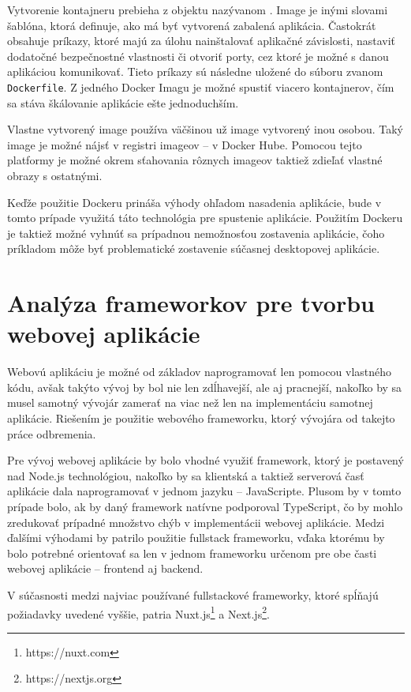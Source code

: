 Vytvorenie kontajneru prebieha z objektu nazývanom . Image je inými slovami šablóna, ktorá definuje, ako má byť vytvorená zabalená aplikácia. Častokrát obsahuje príkazy, ktoré majú za úlohu nainštalovať aplikačné závislosti, nastaviť dodatočné bezpečnostné vlastnosti či otvoriť porty, cez ktoré je možné s danou aplikáciou komunikovať. Tieto príkazy sú následne uložené do súboru zvanom \texttt{Dockerfile}. Z jedného Docker Imagu je možné spustiť viacero kontajnerov, čím sa stáva škálovanie aplikácie ešte jednoduchším.

Vlastne vytvorený image používa väčšinou už image vytvorený inou osobou. Taký image je možné nájsť v registri imageov -- v Docker Hube. Pomocou tejto platformy je možné okrem sťahovania rôznych imageov taktiež zdieľať vlastné obrazy s ostatnými.

Keďže použitie Dockeru prináša výhody ohľadom nasadenia aplikácie, bude v tomto prípade využitá táto technológia pre spustenie aplikácie. Použitím Dockeru je taktiež možné vyhnúť sa prípadnou nemožnosťou zostavenia aplikácie, čoho príkladom môže byť problematické zostavenie súčasnej desktopovej aplikácie.

\clearpage

\section {Analýza frameworkov pre tvorbu webovej aplikácie}
Webovú aplikáciu je možné od základov naprogramovať len pomocou vlastného kódu, avšak takýto vývoj by bol nie len zdĺhavejší, ale aj pracnejší, nakoľko by sa musel samotný vývojár zamerať na viac než len na implementáciu samotnej aplikácie. Riešením je použitie webového frameworku, ktorý vývojára od takejto práce odbremenia. 

Pre vývoj webovej aplikácie by bolo vhodné využiť framework, ktorý je postavený nad Node.js technológiou, nakoľko by sa klientská a taktiež serverová časť aplikácie dala naprogramovať v jednom jazyku -- JavaScripte. Plusom by v tomto prípade bolo, ak by daný framework natívne podporoval TypeScript, čo by mohlo zredukovať prípadné množstvo chýb v implementácii webovej aplikácie.
Medzi ďalšími výhodami by patrilo použitie fullstack frameworku, vďaka ktorému by bolo potrebné orientovať sa len v jednom frameworku určenom pre obe časti webovej aplikácie -- frontend aj backend.

V súčasnosti medzi najviac používané fullstackové frameworky, ktoré \newline spĺňajú požiadavky uvedené vyššie, patria Nuxt.js\footnote{https://nuxt.com} a Next.js\footnote{https://nextjs.org}.

